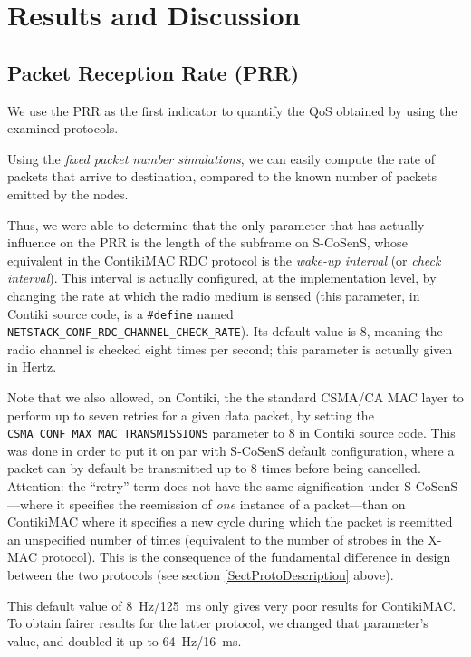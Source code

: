 \documentclass[conference]{IEEEtran}
\begin{document}
\section{Results and Discussion}

\subsection{Packet Reception Rate (PRR)}

We use the PRR as the first indicator to quantify the QoS obtained by
using the examined protocols.

Using the \emph{fixed packet number simulations}, we can easily compute the
rate of packets that arrive to destination, compared to the known number
of packets emitted by the nodes.

Thus, we were able to determine that the only parameter that has actually
influence on the PRR is the length of the subframe on S-CoSenS, whose
equivalent in the ContikiMAC RDC protocol is the \emph{wake-up interval}
(or \emph{check interval}). This interval is actually configured, at the
implementation level, by changing the rate at which the radio medium is
sensed (this parameter, in Contiki source code, is a \texttt{\#define} named
\texttt{NETSTACK\_CONF\_RDC\_CHANNEL\_CHECK\_RATE}).
Its default value is 8, meaning the radio channel is checked eight times
per second; this parameter is actually given in Hertz.

Note that we also allowed, on Contiki, the the standard CSMA/CA MAC layer
to perform up to seven retries for a given data packet, by setting the
\texttt{CSMA\_CONF\_MAX\_MAC\_TRANSMISSIONS}
parameter to 8 in Contiki source code. This was done in order to put it
on par with S-CoSenS default configuration, where a packet can by default
be transmitted up to 8 times before being cancelled.
Attention: the ``retry'' term does not have the same signification
under S-CoSenS---where it specifies the reemission of \emph{one} instance of
a packet---than on ContikiMAC where it specifies a new cycle during
which the packet is reemitted an unspecified number of times (equivalent
to the number of strobes in the X-MAC protocol). This is the consequence
of the fundamental difference in design between the two protocols
(see section \ref{SectProtoDescription} above).

This default value of 8~Hz/125~ms only gives very poor results for ContikiMAC.
To obtain fairer results for the latter protocol, we changed that parameter's
value, and doubled it up to 64~Hz/16~ms.
\end{document}
